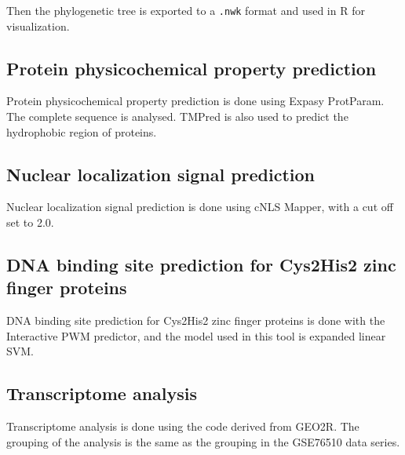 Then the phylogenetic tree is exported to a \texttt{.nwk} format and used in R for visualization.

\subsection{Protein physicochemical property prediction}
Protein physicochemical property prediction is done using Expasy ProtParam. The complete sequence is analysed.
TMPred is also used to predict the hydrophobic region of proteins.
\subsection{Nuclear localization signal prediction}
Nuclear localization signal prediction is done using cNLS Mapper, with a cut off set to 2.0.

\subsection{DNA binding site prediction for Cys2His2 zinc finger proteins}
DNA binding site prediction for Cys2His2 zinc finger proteins is done with the Interactive PWM predictor, and the model used in this tool is expanded linear SVM.

\subsection{Transcriptome analysis}
Transcriptome analysis is done using the code derived from GEO2R. The grouping of the analysis is the same as the grouping in the GSE76510 data series.